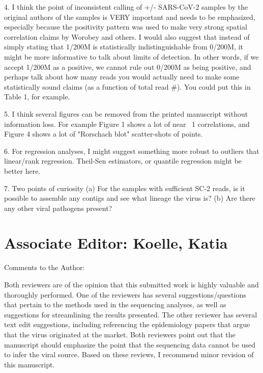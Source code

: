 \documentclass[11pt, oneside]{article}   	%
\begin{document}
4. I think the point of inconsistent calling of +/- SARS-CoV-2 samples by the original authors of the samples is VERY important and needs to be emphasized, especially because the positivity pattern was used to make very strong spatial correlation claims by Worobey and others. I would also suggest that instead of simply stating that 1/200M is statistically indistinguishable from 0/200M, it might be more informative to talk about limits of detection. In other words, if we accept 1/200M as a positive, we cannot rule out 0/200M as being positive, and perhaps talk about how many reads you would actually need to make some statistically sound claims (as a function of total read \#). You could put this in Table 1, for example.

5. I think several figures can be removed from the printed manuscript without information loss. For example Figure 1 shows a lot of near ~1 correlations, and Figure 4 shows a lot of "Rorschach blot" scatter-shots of points.

6. For regression analyses, I might suggest something more robust to outliers that linear/rank regression. Theil-Sen estimators, or quantile regression might be better here.

7. Two points of curiosity
   (a) For the samples with sufficient SC-2 reads, is it possible to assemble any contigs and see what lineage the virus is?
   (b) Are there any other viral pathogens present?


\section*{Associate Editor: Koelle, Katia}

Comments to the Author:

Both reviewers are of the opinion that this submitted work is highly valuable and thoroughly performed. One of the reviewers has several suggestions/questions that pertain to the methods used in the sequencing analyses, as well as suggestions for streamlining the results presented. The other reviewer has several text edit suggestions, including referencing the epidemiology papers that argue that the virus originated at the market. Both reviewers point out that the manuscript should emphasize the point that the sequencing data cannot be used to infer the viral source. Based on these reviews, I recommend minor revision of this manuscript.

\color{black}

{\small

}
\end{document}
